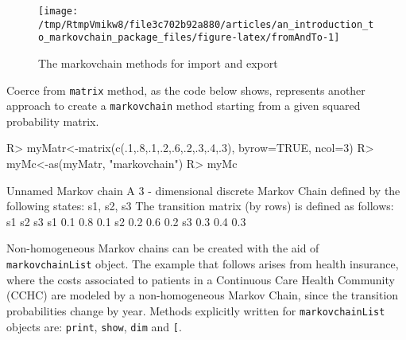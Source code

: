 \documentclass[
  nojss]{jss}
\begin{document}
\begin{CodeChunk}
\begin{figure}

{\centering \texttt{[image: /tmp/RtmpVmikw8/file3c702b92a880/articles/an\_introduction\_to\_markovchain\_package\_files/figure-latex/fromAndTo-1]} 

}

\caption[The markovchain methods for import and export]{The markovchain methods for import and export}\label{fig:fromAndTo}
\end{figure}
\end{CodeChunk}

Coerce from \texttt{matrix} method, as the code below shows, represents another approach to create a \texttt{markovchain} method starting from a given squared probability matrix.

\begin{CodeChunk}

\begin{CodeInput}
R> myMatr<-matrix(c(.1,.8,.1,.2,.6,.2,.3,.4,.3), byrow=TRUE, ncol=3)
R> myMc<-as(myMatr, "markovchain")
R> myMc
\end{CodeInput}

\begin{CodeOutput}
Unnamed Markov chain 
 A  3 - dimensional discrete Markov Chain defined by the following states: 
 s1, s2, s3 
 The transition matrix  (by rows)  is defined as follows: 
    s1  s2  s3
s1 0.1 0.8 0.1
s2 0.2 0.6 0.2
s3 0.3 0.4 0.3
\end{CodeOutput}
\end{CodeChunk}

Non-homogeneous Markov chains can be created with the aid of \texttt{markovchainList} object. The example that follows arises from health insurance, where the costs associated to patients in a Continuous Care Health Community (CCHC) are modeled by a non-homogeneous Markov Chain, since the transition probabilities change by year. Methods explicitly written for \texttt{markovchainList} objects are: \texttt{print}, \texttt{show}, \texttt{dim} and \texttt{{[}}.
\end{document}
